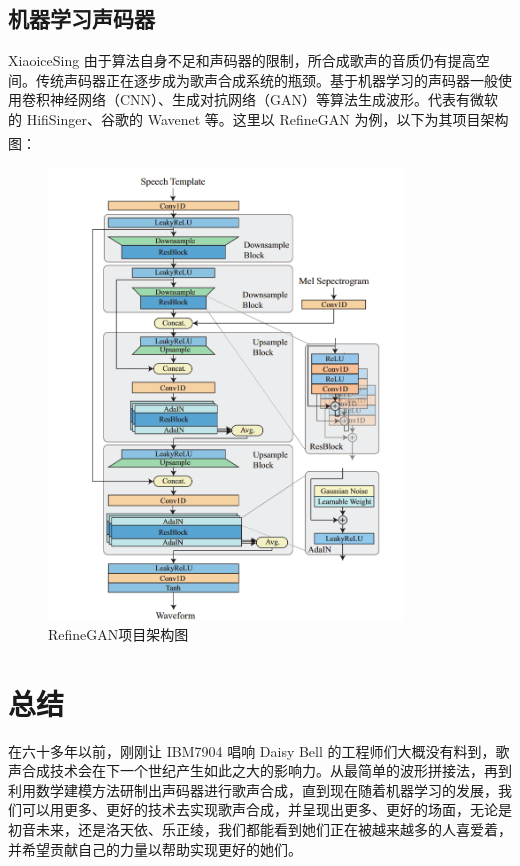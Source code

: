 \documentclass[12pt,a4paper]{ctexart}
\newcommand{\supercite}[1]{\textsuperscript{\cite{#1}}}
\begin{document}
\subsection{机器学习声码器}
XiaoiceSing 由于算法自身不足和声码器的限制，所合成歌声的音质仍有提高空间。传统声码器正在逐步成为歌声合成系统的瓶颈。基于机器学习的声码器一般使用卷积神经网络（CNN）、生成对抗网络（GAN）等算法生成波形。代表有微软的 HifiSinger、谷歌的 Wavenet 等。这里以 RefineGAN 为例，以下为其项目架构图\supercite{11}：
\begin{figure}[H]
    \centering
    \includegraphics[height=12cm]{figure4.png}
    \caption{RefineGAN项目架构图}
\end{figure}
\section{总结}
在六十多年以前，刚刚让 IBM7904 唱响 Daisy Bell 的工程师们大概没有料到，歌声合成技术会在下一个世纪产生如此之大的影响力。从最简单的波形拼接法，再到利用数学建模方法研制出声码器进行歌声合成，直到现在随着机器学习的发展，我们可以用更多、更好的技术去实现歌声合成，并呈现出更多、更好的场面，无论是初音未来，还是洛天依、乐正绫，我们都能看到她们正在被越来越多的人喜爱着，并希望贡献自己的力量以帮助实现更好的她们。

\newpage
\small
\end{document}
